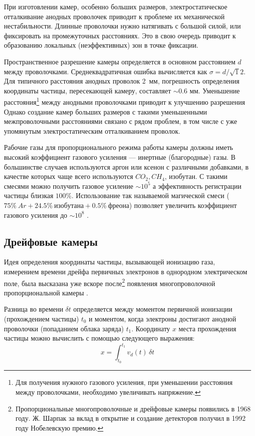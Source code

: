 При изготовлении камер, особенно больших размеров, электростатическое
отталкивание анодных проволочек приводит к проблеме их механической
нестабильности. Длинные проволочки нужно натягивать с большой силой, или
фиксировать на промежуточных расстояниях. Это в свою очередь приводит
к образованию локальных (неэффективных) зон в точке фиксации.

Пространственное разрешение камеры определяется в основном расстоянием
$d$ между проволочками. Среднеквадратичная ошибка вычисляется как
$\sigma = d/\sqrt 12$. Для типичного расстояния анодных проволок 2~мм,
погрешность определения координаты частицы, пересекающей камеру,
составляет $\sim 0.6$ мм. Уменьшение расстояния\footnote{Для получения
  нужного газового усиления, при уменьшении расстояния между
  проволочками, необходимо увеличивать напряжение.}
между анодными проволочками приводит к улучшению разрешения
Однако создание камер больших размеров с такими уменьшенными
межпроволочными расстояниями связано с рядом проблем, в том числе с
уже упомянутым электростатическим отталкиванием проволок.

Рабочие газы для пропорционального режима работы камеры должны иметь
высокий коэффициент газового усиления ---  инертные (благородные) газы.
В большинстве случаев используются аргон или ксенон с различными добавками,
в качестве которых чаще всего используются $CO_2, CH_4$, изобутан. С такими
смесями можно получить газовое усиление $\sim 10^5$ а эффективность
регистрации частицы близкая $100\%$. Использование так называемой
магической смеси ($75\%~Ar + 24.5\%~изобутана + 0.5\%~фреона$) позволяет
увеличить коэффициент газового усиления до $\sim 10^8$ \cite{zan:78}.

\subsection{Дрейфовые камеры}
Идея определения координаты частицы, вызывающей ионизацию газа,
измерением времени дрейфа первичных электронов в однородном
электрическом поле, была высказана уже вскоре после\footnote{
  Пропорциональные многопроволочные и дрейфовые камеры появились
  в 1968 году. Ж. Шарпак за вклад в открытие и создание детекторов
  получил в 1992 году Нобелевскую премию.}
появления многопроволочной пропорциональной камеры \cite{char:93}.

Разница во времени $\delta t$ определяется между моментом первичной
ионизации (прохождением частицы) $t_0$ и моментом, когда электроны
достигают анодной проволочки (попаданием облака заряда) $t_1$. Координату
$x$ места прохождения частицы можно вычислить с помощью следующего
выражения:
\[
x=\int_{t_0}^{t_1} v_d(t)\,\delta t
\]

